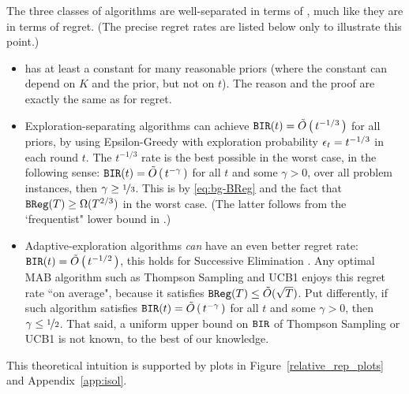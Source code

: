 The three classes of algorithms are well-separated in terms of \BIR, much like they are in terms of regret. (The precise regret rates are listed below only to illustrate this point.)
\begin{itemize}
\item \DynGreedy has at least a constant \BIR for many reasonable priors (where the constant can depend on $K$ and the prior, but not on $t$). The reason and the proof are exactly the same as for regret.

\item Exploration-separating algorithms can achieve
    $\mathtt{BIR}(t) = \tilde{O}\left(\,t^{-1/3}\,\right)$
for all priors, \eg by using Epsilon-Greedy with exploration probability $\epsilon_t = t^{-1/3}$ in each round $t$.
The $t^{-1/3}$ rate is the best possible in the worst case, in the following sense: 
    $\mathtt{BIR}(t) = \tilde{O}\left(\,t^{-\gamma}\,\right)$ 
for all $t$ and some $\gamma>0$,
over all problem instances, then $\gamma\geq \nicefrac{1}{3}$. This is by \eqref{eq:bg-BReg} and the fact that $\mathtt{BReg}(T)\geq \Omega(T^{2/3})$ in the worst case. (The latter follows from the `frequentist" lower bound in \citet{MechMAB-ec09}.)

\item Adaptive-exploration algorithms \emph{can} have an even better regret rate: $\mathtt{BIR}(t) = \tilde{O}\left(\, t^{-1/2} \,\right) $, \eg this holds for Successive Elimination \citep{EvenDar-icml06}. Any optimal MAB algorithm such as Thompson Sampling and UCB1 enjoys this regret rate ``on average", because it satisfies 
        $\mathtt{BReg}(T)\leq \tilde{O}(\sqrt{T})$.
    Put differently, if such algorithm satisfies 
        $\mathtt{BIR}(t) = \tilde{O}\left(\,t^{-\gamma}\,\right)$
    for all $t$ and some $\gamma>0$, then $\gamma \leq \nicefrac{1}{2}$.
    That said, a uniform upper bound on $\mathtt{BIR}$ of Thompson Sampling or UCB1 is not known, to the best of our knowledge. 

\end{itemize}

This theoretical intuition is supported by plots in 
Figure~\ref{relative_rep_plots} and Appendix~\ref{app:isol}.


